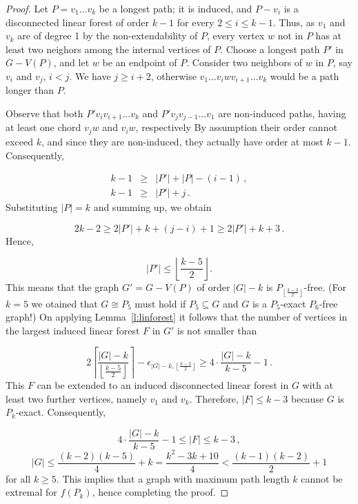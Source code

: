 \documentclass[10pt,a4paper]{amsart}
\begin{document}
\begin{proof}
	Let $P=v_1\dots v_k$ be a longest path; it is induced, and $P-v_i$ is a disconnected linear forest of order $k-1$ for every $2\leq i\leq k-1$.
	Thus, as $v_1$ and $v_k$ are of degree 1 by the non-extendability of $P$, every vertex $w$ not in $P$ has at least two neighors among the internal vertices of $P$.
	Choose a longest path $P'$ in $G-V(P)$, and let $w$ be an endpoint of $P$.
	Consider two neighbors of $w$ in $P$, say $v_i$ and $v_j$, $i<j$.
	We have $j\geq i+2$, otherwise $v_1\dots v_iwv_{i+1}\dots v_k$ would be a path longer than $P$.
	
	Observe that both $P'v_iv_{i+1}\dots v_k$ and $P'v_jv_{j-1}\dots v_1$ are non-induced paths, having at least one chord $v_jw$ and $v_iw$, respectively
	By assumption their order cannot exceed $k$, and since they are non-induced, they actually have order at most $k-1$.
	Consequently,
	
	\begin{eqnarray}
	 k-1 & \geq & |P'| + |P| - (i-1) \,, \nonumber \\
	 k-1 & \geq & |P'| + j \,. \nonumber
	\end{eqnarray}
	Substituting $|P|=k$ and summing up, we obtain
	
	$$
	  2k-2 \geq 2|P'|+k+(j-i)+1 \geq 2|P'|+k+3 \,.
	$$
	Hence,
	
	$$
	  |P'| \leq \left\lfloor \frac{k-5}{2} \right\rfloor .
	$$
	This means that the graph $G'=G-V(P)$ of order $|G|-k$ is $P_{\left\lfloor \frac{k-3}{2} \right\rfloor}$-free.
	(For $k=5$ we otained that $G\cong P_5$ must hold if $P_5\subseteq G$ and $G$ is a $P_5$-exact $P_6$-free graph!)
	On applying Lemma~\ref{l:linforest} it follows that the number of vertices in the largest induced linear forest $F$ in $G'$ is not smaller than
	
	$$
	  2 \left\lceil \frac{|G|-k}{\left\lfloor \frac{k-5}{2} \right\rfloor} \right\rceil - \epsilon_{|G|-k,\left\lfloor \frac{k-3}{2} \right\rfloor}
	  \geq
	  4 \cdot \frac{|G|-k}{k-5} - 1 \,.
	$$
	This $F$ can be extended to an induced disconnected linear forest in $G$ with at least two further vertices, namely $v_1$ and $v_k$.
	Therefore, $|F|\leq k-3$ because $G$ is $P_k$-exact.
	Consequently,
	
	$$
	  4 \cdot \frac{|G|-k}{k-5} - 1 \leq |F| \leq k-3 \,,
	$$
	$$
	  |G| \leq \frac{(k-2)(k-5)}{4} + k = \frac{k^2 - 3k + 10}{4}
	  <
	  \frac{(k-1)(k-2)}{2} + 1
	$$
	for all $k\geq 5$.
	This implies that a graph with maximum path length $k$ cannot be extremal for $f(P_k)$, hence completing the proof.	
\end{proof}
\end{document}
